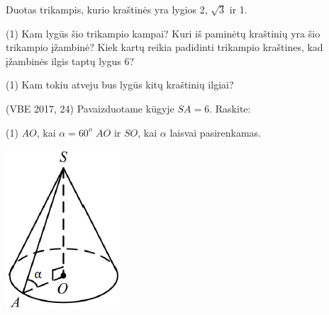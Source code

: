 \documentclass[a4paper]{article}
\newcounter{nameOfYourChoice}
\newcommand{\resume}{\setcounter{enumi}{\value{nameOfYourChoice}}} %
\begin{document}
\begin{mdframed}[backgroundcolor=blue!10!white, linewidth=3pt]
\begin{enumerate}
\resume
\item Duotas trikampis, kurio kraštinės yra lygios $2$, $\sqrt{3}$ ir 1. 
\begin{tasks}(1)
\task Kam lygūs šio trikampio kampai?
\task Kuri iš paminėtų kraštinių yra šio trikampio įžambinė?
\task Kiek kartų reikia padidinti trikampio kraštines, kad įžambinės ilgis taptų lygus 6?
\end{tasks}
\begin{minipage}[b]{0.87\linewidth}
\begin{tasks}[resume](1)
\task Kam tokiu atveju bus lygūs kitų kraštinių ilgiai?
\end{tasks}
\item (VBE 2017, 24) Pavaizduotame kūgyje $SA=6$. Raskite:
\begin{tasks}(1) 
\task $AO$, kai $\alpha=60^o$
\task $AO$ ir $SO$, kai $\alpha$ laisvai pasirenkamas.
\end{tasks}
\end{minipage}
\begin{minipage}[b]{0.13\linewidth}
\includegraphics[width=\textwidth]{vbe2017_24.png}

\end{minipage}
\end{enumerate}
\end{mdframed}
\end{document}
